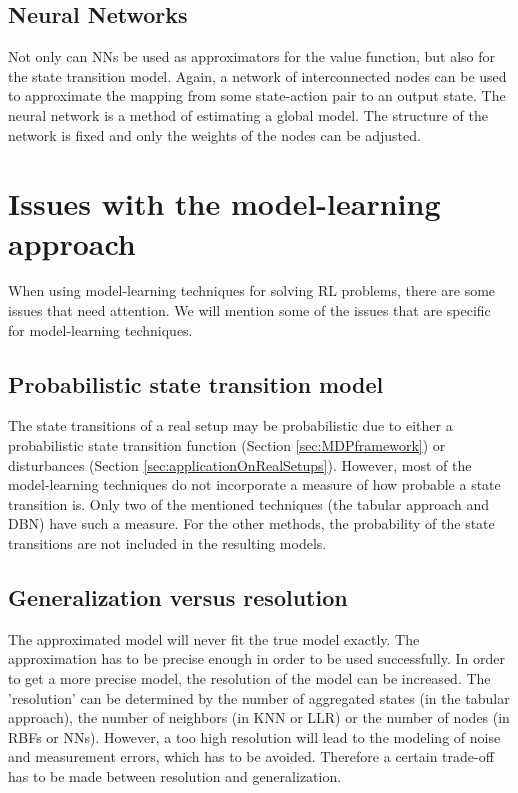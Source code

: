 \documentclass[a4paper,11pt]{mscLiterature}
\begin{document}
\subsection{Neural Networks}
Not only can NNs be used as approximators for the value function, but also for the state transition model. Again, a network of interconnected nodes can be used to approximate the mapping from some state-action pair to an output state. The neural network is a method of estimating a global model. The structure of the network is fixed and only the weights of the nodes can be adjusted.


\section{Issues with the model-learning approach}
When using model-learning techniques for solving RL problems, there are some issues that need attention. We will mention some of the issues that are specific for model-learning techniques. 

\subsection{Probabilistic state transition model}
The state transitions of a real setup may be probabilistic due to either a probabilistic state transition function (Section \ref{sec:MDPframework}) or disturbances (Section \ref{sec:applicationOnRealSetups}). However, most of the model-learning techniques do not incorporate a measure of how probable a state transition is. Only two of the mentioned techniques (the tabular approach and DBN) have such a measure. For the other methods, the probability of the state transitions are not included in the resulting models.

\subsection{Generalization versus resolution}
The approximated model will never fit the true model exactly. The approximation has to be precise enough in order to be used successfully. In order to get a more precise model, the resolution of the model can be increased. The 'resolution' can be determined by the number of aggregated states (in the tabular approach), the number of neighbors (in KNN or LLR) or the number of nodes (in RBFs or NNs). However, a too high resolution will lead to the modeling of noise and measurement errors, which has to be avoided.  Therefore a certain trade-off has to be made between resolution and generalization.
\end{document}

